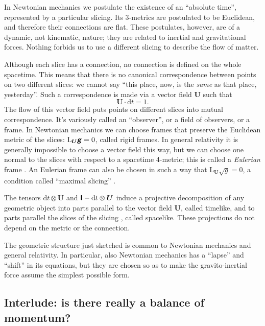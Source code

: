 \documentclass[\ifafour a4paper,12pt,\else a5paper,10pt,\fi%
onecolumn,oneside,article,%
british%
]{memoir}
\theoremstyle{remark}
\theoremstyle{innote}
\newcommand*{\mathte}[1]{\textbf{\textit{\textsf{#1}}}}
\newcommand*{\citep}{\parencites}
\newcommand*{\di}{\mathrm{d}}%
\renewcommand*{\|}{\nonscript\,\vert\nonscript\;\mathopen{}}
\newcommand*{\sect}{\S}%
\newcommand*{\Li}{\mathrm{L}}
\newcommand*{\yrr}{M}
\newcommand*{\yr}{\bm{\yrr}}
\newcommand*{\ycc}{u}
\newcommand*{\yc}{\bm{\ycc}}
\newcommand*{\yFF}{U}
\newcommand*{\yF}{\bm{\yFF}}
\newcommand*{\ygg}{g}
\newcommand*{\yg}{\mathte{\ygg}}
\newcommand*{\ygv}{\sqrt{\ygg}}
\newcommand*{\yI}{\textsf{\textbf{I}}}
\begin{document}
In Newtonian mechanics we postulate the existence of an \enquote{absolute
  time}, represented by a particular slicing. Its 3-metrics are
postulated to be Euclidean, and therefore their connections are flat. These
postulates, however, are of a dynamic, not kinematic, nature; they are
related to inertial and gravitational forces. Nothing forbids us to use a
different slicing to describe the flow of matter.

Although each slice has a connection, no connection is defined on the whole
spacetime. This means that there is no canonical correspondence between
points on two different slices: we cannot say \enquote{this place, now, is
  the \emph{same} as that place, yesterday}. Such a correspondence is made
via a vector field $\yF$ such that
\begin{equation}
  \label{eq:observer_field_unit-time}
  \yF \cdot \di t = 1.
\end{equation}
The flow of this vector field puts points on different slices into mutual
correspondence. It's variously called an \enquote{observer}, or a field of
observers, or a frame. In Newtonian mechanics we can choose frames that
preserve the Euclidean metric of the slices: $\Li_{\yF}\yg = 0$, called
rigid frames. In general relativity it is generally impossible to choose a
vector field this way, but we can choose one normal to the slices with
respect to a spacetime 4-metric; this is called a \emph{Eulerian} frame
\citep{smarretal1978,smarretal1980}. An Eulerian frame can also be chosen in
such a way that $\Li_{\yF}\ygv=0$, a condition called \enquote{maximal
  slicing} \citep[\sect~III.B]{smarretal1978}.

The tensors $\di t\otimes\yF$ and $\yI-\di t\otimes\yF$ induce a projective
decomposition of any geometric object into parts parallel to the vector
field $\yF$, called timelike, and to parts parallel the slices of the
slicing \citep[\sect~B.1.4]{hehletal2003}, called spacelike. These
projections do not depend on the metric or the connection.

The geometric structure just sketched is common to Newtonian mechanics and
general relativity. In particular, also Newtonian mechanics has a
\enquote{lapse} and \enquote{shift} in its equations, but they are chosen
so as to make the gravito-inertial force assume the simplest possible form.

\iffalse
\subsection{Interlude: is there really a balance of momentum?}
\label{sec:really_balance_momentum}
\end{document}
